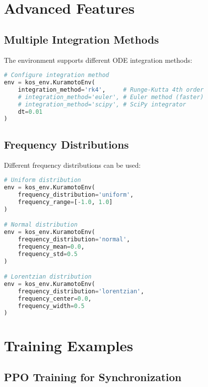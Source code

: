 \section{Advanced Features}

\subsection{Multiple Integration Methods}

The environment supports different ODE integration methods:

\begin{lstlisting}[language=python, caption=Integration Methods]
# Configure integration method
env = kos_env.KuramotoEnv(
    integration_method='rk4',     # Runge-Kutta 4th order
    # integration_method='euler', # Euler method (faster)
    # integration_method='scipy', # SciPy integrator
    dt=0.01
)
\end{lstlisting}

\subsection{Frequency Distributions}

Different frequency distributions can be used:

\begin{lstlisting}[language=python, caption=Frequency Distributions]
# Uniform distribution
env = kos_env.KuramotoEnv(
    frequency_distribution='uniform',
    frequency_range=[-1.0, 1.0]
)

# Normal distribution
env = kos_env.KuramotoEnv(
    frequency_distribution='normal',
    frequency_mean=0.0,
    frequency_std=0.5
)

# Lorentzian distribution
env = kos_env.KuramotoEnv(
    frequency_distribution='lorentzian',
    frequency_center=0.0,
    frequency_width=0.5
)
\end{lstlisting}

\section{Training Examples}

\subsection{PPO Training for Synchronization}

